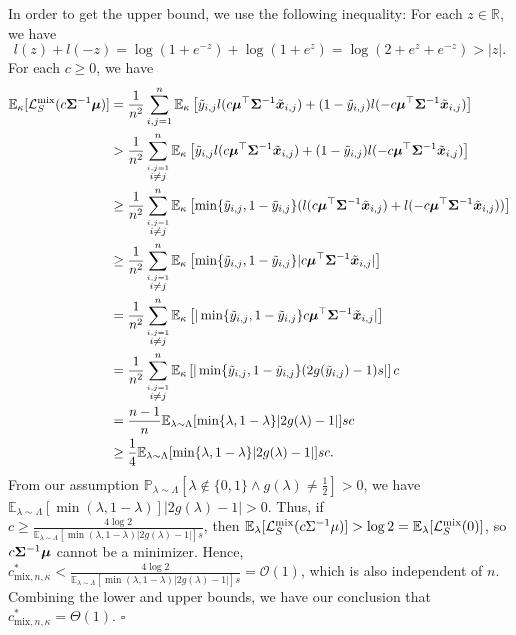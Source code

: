 In order to get the upper bound, we use the following inequality: For each $z \in \mathbb{R}$, we have
\begin{equation*}
    l(z) + l(-z) = \log(1+e^{-z}) + \log(1+e^z) = \log(2+e^z + e^{-z}) > |z|.
\end{equation*}
For each $c \geq 0$, we have
\begin{align*}
    \mathbb{E}_\kappa[\mathcal{L}_S^\mathrm{mix}(c {\bm{\Sigma}}^{-1}{\bm{\mu}})] &= \frac{1}{n^2}  \sum_{i,j=1}^n \mathbb{E}_\kappa\left[\tilde{y}_{i,j} l( c {\bm{\mu}}^\top {\bm{\Sigma}}^{-1} \tilde{{\bm{x}}}_{i,j}) + (1-\tilde{y}_{i,j})l(- c {\bm{\mu}}^\top {\bm{\Sigma}}^{-1} \tilde{{\bm{x}}}_{i,j})\right]\\
    &> \frac{1}{n^2} \sum_{\overset{i,j=1}{i \neq j}}^n \mathbb{E}_\kappa\left[ \tilde{y}_{i,j} l( c {\bm{\mu}}^\top {\bm{\Sigma}}^{-1} \tilde{{\bm{x}}}_{i,j}) + (1-\tilde{y}_{i,j})l(- c {\bm{\mu}}^\top {\bm{\Sigma}}^{-1} \tilde{{\bm{x}}}_{i,j})\right]\\
    &\geq \frac{1}{n^2} \sum_{\overset{i,j=1}{i \neq j}}^n  \mathbb{E}_\kappa\left[\min \{\tilde{y}_{i,j},1-\tilde{y}_{i,j}\} ( l( c {\bm{\mu}}^\top {\bm{\Sigma}}^{-1} \tilde{{\bm{x}}}_{i,j}) + l(- c {\bm{\mu}}^\top {\bm{\Sigma}}^{-1} \tilde{{\bm{x}}}_{i,j}))\right]\\
    &\geq \frac{1}{n^2}  \sum_{\overset{i,j=1}{i \neq j}}^n \mathbb{E}_\kappa\left[ \min \{ \tilde{y}_{i,j},1-\tilde{y}_{i,j}\} | c {\bm{\mu}}^\top {\bm{\Sigma}}^{-1} \tilde{{\bm{x}}}_{i,j}|\right]\\
    &= \frac{1}{n^2}  \sum_{\overset{i,j=1}{i \neq j}}^n \mathbb{E}_\kappa\left[ |\min \{ \tilde{y}_{i,j},1-\tilde{y}_{i,j}\} c {\bm{\mu}}^\top {\bm{\Sigma}}^{-1} \tilde{{\bm{x}}}_{i,j}|\right]\\
    &= \frac{1}{n^2}  \sum_{\overset{i,j=1}{i \neq j}}^n \mathbb{E}_\kappa\left[ |\min \{ \tilde{y}_{i,j},1-\tilde{y}_{i,j}\}(2g(\tilde{y}_{i,j})-1) s|\right] c\\
    &= \frac{n-1}{n}\mathbb{E}_{\lambda \sim \Lambda}[\min \{\lambda, 1-\lambda \}|2g(\lambda)-1|]s c\\
    &\geq \frac{1}{4}\mathbb{E}_{\lambda \sim \Lambda}[\min \{\lambda, 1-\lambda \}|2g(\lambda)-1|] s c.
\end{align*}
From our assumption $\mathbb{P}_{\lambda \sim \Lambda}\left [\lambda \notin \{ 0,1 \} \land g(\lambda) \neq \frac{1}{2}\right]>0$, we have $\mathbb{E}_{\lambda \sim \Lambda}[\min(\lambda, 1-\lambda)]|2g(\lambda)-1| > 0$. Thus, if $c \geq \frac{4\log 2}{\mathbb{E}_{\lambda \sim \Lambda}[\min(\lambda, 1-\lambda)|2g(\lambda)-1|]s}$, then $\mathbb{E}_\lambda[\mathcal{L}_S^\mathrm{mix} (c \Sigma^{-1}\mu)] > \log2 = \mathbb{E}_\lambda[\mathcal{L}_S^\mathrm{mix} (0)]$, so $c{\bm{\Sigma}}^{-1}{\bm{\mu}}$ cannot be a minimizer. Hence, $c_{\mathrm{mix},n,\kappa}^* <\frac{4\log 2}{\mathbb{E}_{\lambda \sim \Lambda}[\min(\lambda, 1-\lambda)|2g(\lambda)-1|]s} 
 = \mathcal O(1)$, which is also independent of $n$. Combining the lower and upper bounds, we have our conclusion that $c_{\mathrm{mix},n,\kappa}^* = \Theta(1)$.
\hfill $\square$
